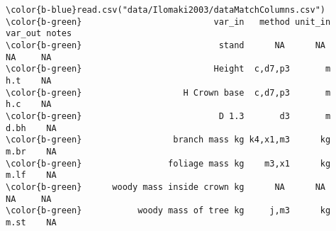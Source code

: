 \documentclass[class=minimal,border=0]{standalone}
\begin{document}
%
\begin{BVerbatim}[bgcolor=b-darkgrey]
\color{b-blue}read.csv("data/Ilomaki2003/dataMatchColumns.csv")
\color{b-green}                          var_in   method unit_in  var_out notes
\color{b-green}                           stand      NA      NA       NA     NA
\color{b-green}                          Height  c,d7,p3       m      h.t    NA
\color{b-green}                    H Crown base  c,d7,p3       m      h.c    NA
\color{b-green}                           D 1.3       d3       m     d.bh    NA
\color{b-green}                  branch mass kg k4,x1,m3      kg     m.br    NA
\color{b-green}                 foliage mass kg    m3,x1      kg     m.lf    NA
\color{b-green}      woody mass inside crown kg      NA      NA       NA     NA
\color{b-green}           woody mass of tree kg     j,m3      kg     m.st    NA
\end{BVerbatim}
\end{document}
